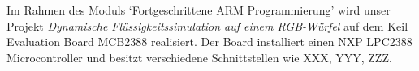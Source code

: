 Im Rahmen des Moduls `Fortgeschrittene ARM Programmierung' wird unser Projekt \textit{Dynamische Fl\"ussigkeitssimulation auf einem RGB-W\"urfel} auf dem Keil Evaluation Board MCB2388 realisiert. Der Board installiert einen NXP LPC2388 Microcontroller und besitzt verschiedene Schnittstellen wie XXX, YYY, ZZZ.